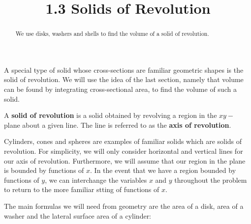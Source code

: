 \documentclass{ximera}
\title{1.3 Solids of Revolution}
\begin{document}
\begin{abstract}
We use disks, washers and shells to find the volume of a solid of revolution.
\end{abstract}

\maketitle

A special type of solid whose cross-sections are familiar geometric shapes is the solid of revolution. 
We will use the idea of the last section, namely that volume can be found by integrating cross-sectional area, 
to find the volume of such a solid.  

\begin{definition} A \textbf{solid of revolution} is a solid obtained by revolving a region in the
 $xy-$ plane about a given line.  The line is referred to as the \textbf{axis of revolution}.

\end{definition}
Cylinders, cones and spheres are examples of familiar solids which are solids of revolution. 
For simplicity, we will only consider horizontal and vertical lines for our axis of revolution.  
Furthermore, we will assume that our region in the plane is bounded by functions of $x$.  
In the event that we have a region bounded by functions of $y$, we can interchange the 
variables $x$ and $y$ throughout the problem to return to the more familiar stting of functions of $x$.

The main formulas we will need from geometry are the area of a disk, area of a washer and 
the lateral surface area of a cylinder:
\end{document}
